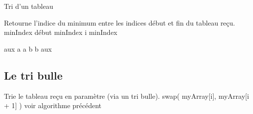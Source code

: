 \begin{Fiche}{Tri d’un tableau}
\begin{pseudocode}
		\Empty
		\LComment Retourne l’indice du minimum entre les indices début 
		et fin du tableau reçu.
			\Let minIndex \Gets début
					\Let minIndex \Gets i
				\EndIf
			\EndFor
			\Return minIndex
		\EndAlgo

		\Empty
			\Let aux \Gets a
			\Let a \Gets b
			\Let b \Gets aux
		\EndAlgo
	\end{pseudocode}




	

\subsection*{Le tri bulle}

	\begin{pseudocode}
	\LComment Trie le tableau reçu en paramètre (via un tri bulle).
						\Stmt swap( myArray[i], myArray[i + 1] )
						\RComment voir algorithme précédent
					\EndIf
				\EndFor
			\EndFor
		\EndAlgo
	\end{pseudocode}


	
\end{Fiche}
